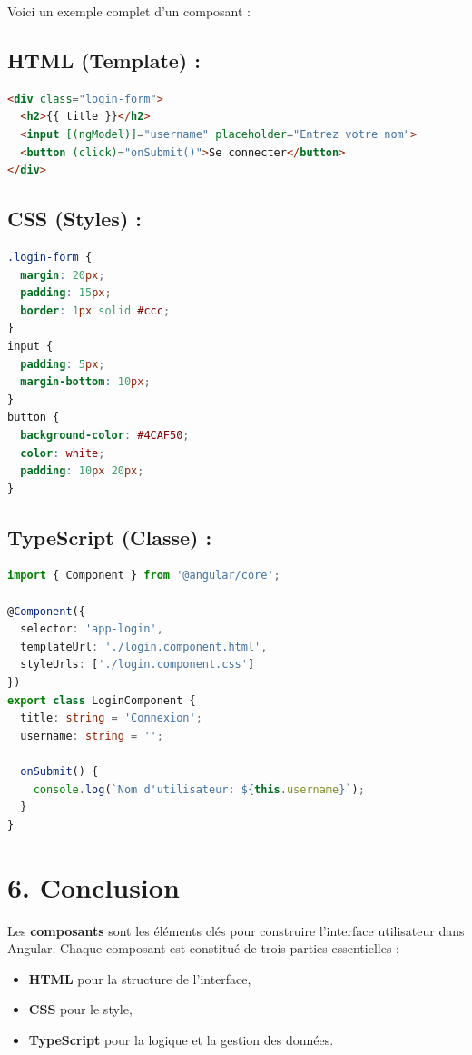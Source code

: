 \documentclass{article}
\begin{document}
Voici un exemple complet d’un composant :

\subsection*{HTML (Template) :}
\begin{lstlisting}[language=HTML, caption={HTML example of a login form}, label={lst:login-form}]
<div class="login-form">
  <h2>{{ title }}</h2>
  <input [(ngModel)]="username" placeholder="Entrez votre nom">
  <button (click)="onSubmit()">Se connecter</button>
</div>
\end{lstlisting}

\subsection*{CSS (Styles) :}
\begin{lstlisting}[language=CSS, caption={CSS styling for login form}, label={lst:css-login-form}]
.login-form {
  margin: 20px;
  padding: 15px;
  border: 1px solid #ccc;
}
input {
  padding: 5px;
  margin-bottom: 10px;
}
button {
  background-color: #4CAF50;
  color: white;
  padding: 10px 20px;
}
\end{lstlisting}


\subsection*{TypeScript (Classe) :}
\begin{lstlisting}[language=TypeScript, caption={TypeScript class for login functionality}, label={lst:typescript-login}]
import { Component } from '@angular/core';

@Component({
  selector: 'app-login',
  templateUrl: './login.component.html',
  styleUrls: ['./login.component.css']
})
export class LoginComponent {
  title: string = 'Connexion';
  username: string = '';

  onSubmit() {
    console.log(`Nom d'utilisateur: ${this.username}`);
  }
}
\end{lstlisting}


\section*{6. Conclusion}

Les \textbf{composants} sont les éléments clés pour construire l'interface utilisateur dans Angular. Chaque composant est constitué de trois parties essentielles :
\begin{itemize}
  \item \textbf{HTML} pour la structure de l'interface,
  \item \textbf{CSS} pour le style,
  \item \textbf{TypeScript} pour la logique et la gestion des données.
\end{itemize}
\end{document}
